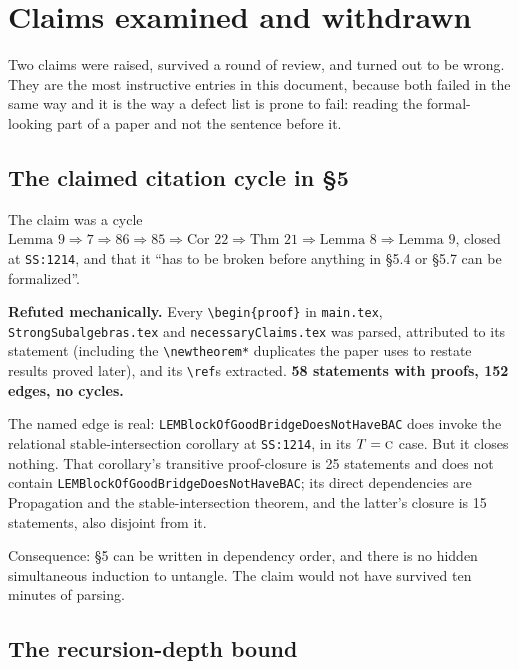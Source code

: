 \section{Claims examined and withdrawn}\label{sec:refuted}

Two claims were raised, survived a round of review, and turned out to be
wrong. They are the most instructive entries in this document, because both
failed in the same way and it is the way a defect list is prone to fail:
reading the formal-looking part of a paper and not the sentence before it.

\subsection{The claimed citation cycle in \S5}\label{sec:refuted-cycle}

The claim was a cycle
$\text{Lemma }9\Rightarrow7\Rightarrow86\Rightarrow85\Rightarrow
\text{Cor }22\Rightarrow\text{Thm }21\Rightarrow\text{Lemma }8\Rightarrow
\text{Lemma }9$, closed at \texttt{SS:1214}, and that it ``has to be broken
before anything in \S5.4 or \S5.7 can be formalized''.

\textbf{Refuted mechanically.} Every \verb|\begin{proof}| in \texttt{main.tex},
\texttt{StrongSubalgebras.tex} and \texttt{necessary\brk Claims.tex} was parsed,
attributed to its statement (including the \verb|\newtheorem*| duplicates the
paper uses to restate results proved later), and its \verb|\ref|s extracted.
\textbf{58 statements with proofs, 152 edges, no cycles.}

The named edge is real: \texttt{LEMBlockOfGoodBridgeDoesNotHaveBAC} does invoke
the relational stable-intersection corollary at \texttt{SS:1214}, in its
$T=\textup{\textsc{c}}$ case. But it closes nothing. That corollary's transitive proof-closure
is 25 statements and does not contain
\texttt{LEMBlockOfGoodBridgeDoesNotHaveBAC}; its direct dependencies are
Propagation and the stable-intersection theorem, and the latter's closure is 15
statements, also disjoint from it.

Consequence: \S5 can be written in dependency order, and there is no hidden
simultaneous induction to untangle. The claim would not have survived ten
minutes of parsing.

\subsection{The recursion-depth bound}\label{sec:refuted-depth}

